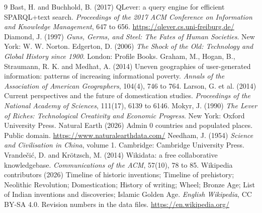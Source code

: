 \documentclass[11pt,a4paper]{article}
\begin{document}
\begin{thebibliography}{9}
 Bast, H. and Buchhold, B. (2017) QLever: a query engine for efficient SPARQL+text search. \emph{Proceedings of the 2017 ACM Conference on Information and Knowledge Management}, 647 to 656. \url{https://qlever.cs.uni-freiburg.de/}
 Diamond, J. (1997) \emph{Guns, Germs, and Steel: The Fates of Human Societies}. New York: W. W. Norton.
 Edgerton, D. (2006) \emph{The Shock of the Old: Technology and Global History since 1900}. London: Profile Books.
 Graham, M., Hogan, B., Straumann, R. K. and Medhat, A. (2014) Uneven geographies of user-generated information: patterns of increasing informational poverty. \emph{Annals of the Association of American Geographers}, 104(4), 746 to 764.
 Larson, G. et al. (2014) Current perspectives and the future of domestication studies. \emph{Proceedings of the National Academy of Sciences}, 111(17), 6139 to 6146.
 Mokyr, J. (1990) \emph{The Lever of Riches: Technological Creativity and Economic Progress}. New York: Oxford University Press.
 Natural Earth (2026) Admin 0 countries and populated places. Public domain. \url{https://www.naturalearthdata.com/}
 Needham, J. (1954) \emph{Science and Civilisation in China}, volume 1. Cambridge: Cambridge University Press.
 Vrandečić, D. and Krötzsch, M. (2014) Wikidata: a free collaborative knowledgebase. \emph{Communications of the ACM}, 57(10), 78 to 85.
 Wikipedia contributors (2026) Timeline of historic inventions; Timeline of prehistory; Neolithic Revolution; Domestication; History of writing; Wheel; Bronze Age; List of Indian inventions and discoveries; Islamic Golden Age. \emph{English Wikipedia}, CC BY-SA 4.0. Revision numbers in the data files. \url{https://en.wikipedia.org/}
\end{thebibliography}
\end{document}
